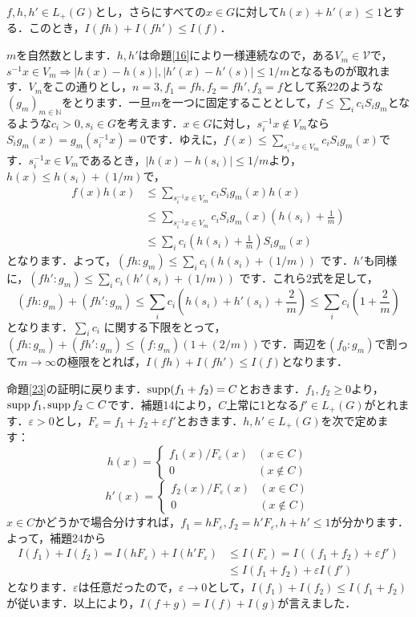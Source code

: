 \begin{Proof}
\begin{ylem}\label{24}
$f, h, h'\in L_{+}(G)$とし，さらにすべての$x \in G$に対して$h(x)+h'(x) \le 1$とする．このとき，$I(fh)+I(fh') \le I(f)$．
\end{ylem}
\begin{Proof}
$m$を自然数とします．$h,h'$は命題\ref{16}により一様連続なので，ある$V_m \in \mathscr{V}$で，$s^{-1}x \in V_{m} \Rightarrow |h(x)-h(s)|, |h'(x)-h'(s)| \le 1/m$となるものが取れます．$V_m$をこの通りとし，$n=3, f_1=fh, f_2=fh', f_3=f$として系22のような$(g_m)_{m \in \mathbb{N}}$をとります．一旦$m$を一つに固定することとして，$f \le \sum_{i}c_i S_{i}g_m$となるような$c_i>0, s_i \in G$を考えます．$x \in G$に対し，$s_{i}^{-1}x \not\in V_m$なら$S_{i}g_{m}(x)=g_{m}(s_{i}^{-1}x)=0$です．ゆえに，$f(x) \le \sum_{s_{i}^{-1}x \in V_m} c_{i}S_{i}g_{m}(x)$です．$s_{i}^{-1}x \in V_m$であるとき，$|h(x)-h(s_i)| \le 1/m$より，$h(x) \le h(s_i)+(1/m)$で，
\begin{align*}
f(x)h(x)  & \le \sum_{s_{i}^{-1}x \in V_m} c_{i}S_{i}g_{m}(x)h(x) \\
& \le \sum_{s_{i}^{-1}x \in V_m} c_{i}S_{i}g_{m}(x) \left( h(s_i)+\frac{1}{m} \right) \\
& \le \sum_{i}c_{i} \left( h(s_i)+\frac{1}{m} \right) S_{i}g_{m}(x)
\end{align*}
となります．よって，$( fh : g_m ) \le \sum_{i}c_{i} ( h(s_i)+(1/m) )$ です．$h'$も同様に，$( fh' : g_m ) \le \sum_{i}c_{i} ( h'(s_i)+(1/m) )$ です．これら2式を足して，
\[
( fh : g_m )+( fh' : g_m ) \le \sum_{i}c_{i} \left( h(s_i)+h'(s_i)+\frac{2}{m} \right) \le \sum_{i}c_{i} \left( 1+\frac{2}{m} \right)
\]
となります．$\sum_{i}c_{i}$ に関する下限をとって，$( fh : g_m )+( fh' : g_m ) \le ( f : g_m ) ( 1+(2/m) )$です．両辺を$(f_0 : g_m)$で割って$m \to \infty$の極限をとれば，$I(fh)+I(fh') \le I(f)$となります．　
\end{Proof}
命題\ref{23}の証明に戻ります．$\operatorname{supp} (f_{1}+f_{2})=C$とおきます．$f_1, f_2 \ge 0$より，$\operatorname{supp} f_1, \operatorname{supp} f_2 \subset C$です．補題14により，$C$上常に1となる$f' \in L_{+}(G)$がとれます．$\varepsilon>0$とし，$F_{\varepsilon}=f_{1}+f_{2}+\varepsilon f'$とおきます．$h,h' \in L_{+}(G)$を次で定めます：
\[
h(x)=
\begin{cases}
f_{1}(x)/F_{\varepsilon}(x) & (x \in C) \\
0 & (x \not\in C)
\end{cases}
\]
\[
h'(x)=
\begin{cases}
f_{2}(x)/F_{\varepsilon}(x) & (x \in C) \\
0 & (x \not\in C)
\end{cases}
\]
$x \in C$かどうかで場合分けすれば，$f_{1}=hF_{\varepsilon}, f_{2}=h'F_{\varepsilon}, h+h' \le 1$が分かります．よって，補題24から
\begin{align*}
I(f_1)+I(f_2) = I(hF_{\varepsilon})+I(h'F_{\varepsilon}) & \le I(F_{\varepsilon})=I ( (f_{1}+f_{2})+\varepsilon f' ) \\
& \le I(f_{1}+f_{2})+ \varepsilon I(f')
\end{align*}
となります．$\varepsilon$は任意だったので，$\varepsilon \to 0$として，$I(f_1)+I(f_2) \le I(f_{1}+f_{2})$が従います．以上により，$I(f+g)=I(f)+I(g)$が言えました．　
\end{Proof}

